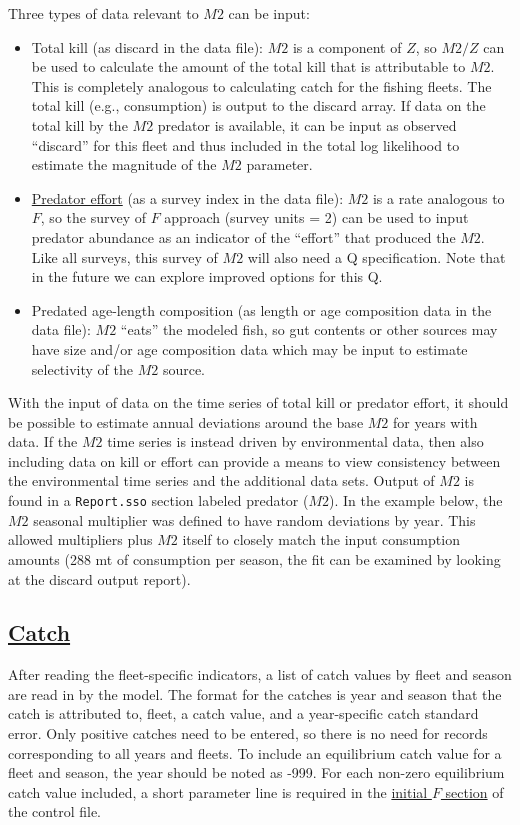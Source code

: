 Three types of data relevant to $M2$ can be input:

\begin{itemize}
	\item Total kill (as discard in the data file): $M2$ is a component of $Z$, so $M2/Z$ can be used to calculate the amount of the total kill that is attributable to $M2$. This is completely analogous to calculating catch for the fishing fleets. The total kill (e.g., consumption) is output to the discard array. If data on the total kill by the $M2$ predator is available, it can be input as observed ``discard'' for this fleet and thus included in the total log likelihood to estimate the magnitude of the $M2$ parameter.
	
	\item \hyperlink{PredEffort}{Predator effort} (as a survey index in the data file): $M2$ is a rate analogous to $F$, so the survey of $F$ approach (survey units = 2) can be used to input predator abundance as an indicator of the ``effort'' that produced the $M2$. Like all surveys, this survey of $M2$ will also need a Q specification. Note that in the future we can explore improved options for this Q.
	
	\item Predated age-length composition (as length or age composition data in the data file): $M2$ ``eats'' the modeled fish, so gut contents or other sources may have size and/or age composition data which may be input to estimate selectivity of the $M2$ source. 
\end{itemize}

With the input of data on the time series of total kill or predator effort, it should be possible to estimate annual deviations around the base $M2$ for years with data. If the $M2$ time series is instead driven by environmental data, then also including data on kill or effort can provide a means to view consistency between the environmental time series and the additional data sets. Output of $M2$ is found in a \texttt{Report.sso} section labeled predator ($M2$). In the example below, the $M2$ seasonal multiplier was defined to have random deviations by year. This allowed multipliers plus $M2$ itself to closely match the input consumption amounts (288 mt of consumption per season, the fit can be examined by looking at the discard output report).

\hypertarget{Catch}{}
\subsection[Catch]{\protect\hyperlink{Catch}{Catch}}
\hypertarget{CatchFormat}{}
After reading the fleet-specific indicators, a list of catch values by fleet and season are read in by the model. The format for the catches is year and season that the catch is attributed to, fleet, a catch value, and a year-specific catch standard error. Only positive catches need to be entered, so there is no need for records corresponding to all years and fleets. To include an equilibrium catch value for a fleet and season, the year should be noted as -999. For each non-zero equilibrium catch value included, a short parameter line is required in the \hyperlink{InitF}{initial $F$ section} of the control file.

